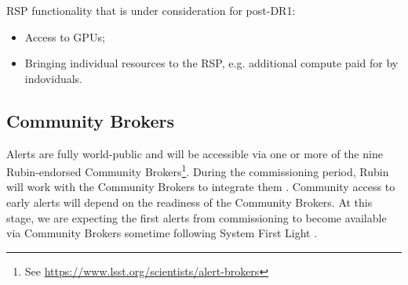 RSP functionality that is under consideration for post-DR1:
\begin{itemize}
\item Access to GPUs;
\item Bringing individual resources to the RSP, e.g. additional compute paid for by indoviduals. 
\end{itemize} 

\subsection{Community Brokers }
Alerts are fully world-public and will be accessible via one or more of the nine Rubin-endorsed Community Brokers\footnote{See \url{https://www.lsst.org/scientists/alert-brokers}}.
During the commissioning period, Rubin will work with the Community Brokers to integrate them .
Community access to early alerts will depend on the readiness of the Community Brokers. 
At this stage, we are expecting the first alerts from commissioning to become available via Community Brokers sometime following System First Light . 
